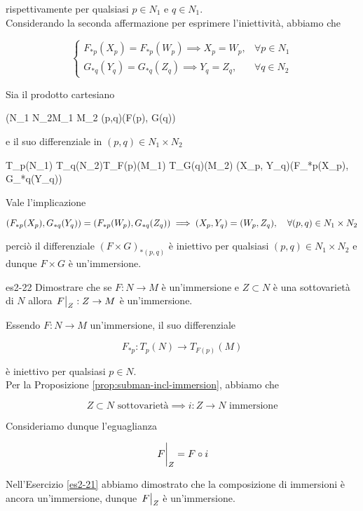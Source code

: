 {rispettivamente per qualsiasi $ p \in N_{1} $ e $ q \in N_{1} $. \\
Considerando la seconda affermazione per esprimere l'iniettività, abbiamo che

\begin{equation}
	\begin{cases}
		F_{*p}(X_{p}) = F_{*p}(W_{p}) \implies X_{p} = W_{p}, & \forall p \in N_{1} \\
		G_{*q}(Y_{q}) = G_{*q}(Z_{q}) \implies Y_{q} = Z_{q}, & \forall q \in N_{2}
	\end{cases}
\end{equation}

Sia il prodotto cartesiano

	{(N_{1} \times N_{2}}{M_{1} \times M_{2}}
	{(p,q)}{(F(p), G(q))}

e il suo differenziale in $ (p,q) \in N_{1} \times N_{2} $

	{T_{p}(N_{1}) \times T_{q}(N_{2})}{T_{F(p)}(M_{1}) \times T_{G(q)}(M_{2})}
	{(X_{p}, Y_{q})}{(F_{*p}(X_{p}), G_{*q}(Y_{q}))}

Vale l'implicazione

\begin{equation}
	(F_{*p}(X_{p}), G_{*q}(Y_{q})) = (F_{*p}(W_{p}), G_{*q}(Z_{q})) %
	\implies %
	(X_{p}, Y_{q}) = (W_{p}, Z_{q}) %
	\qcomma \forall (p,q) \in N_{1} \times N_{2}
\end{equation}

perciò il differenziale $ (F \times G)_{*(p,q)} $ è iniettivo per qualsiasi $ (p,q) \in N_{1} \times N_{2} $ e dunque $ F \times G $ è un'immersione.
}


{es2-22}
{
Dimostrare che se $ F : N \to M $ è un'immersione e $ Z \subset N $ è una sottovarietà di $ N $ allora $ \eval{F}_{Z} : Z \to M $ è un'immersione.
}
{
Essendo $ F : N \to M $ un'immersione, il suo differenziale

\begin{equation}
	F_{*p} : T_{p}(N) \to T_{F(p)}(M)
\end{equation}

è iniettivo per qualsiasi $ p \in N $. \\
Per la Proposizione \ref{prop:subman-incl-immersion}, abbiamo che

\begin{equation}
	Z \subset N \text{ sottovarietà} %
	\implies %
	i : Z \to N \text{ immersione}
\end{equation}

Consideriamo dunque l'eguaglianza

\begin{equation}
	\eval{F}_{Z} = F \circ i
\end{equation}

Nell'Esercizio \ref{es2-21} abbiamo dimostrato che la composizione di immersioni è ancora un'immersione, dunque $ \eval{F}_{Z} $ è un'immersione.
}

